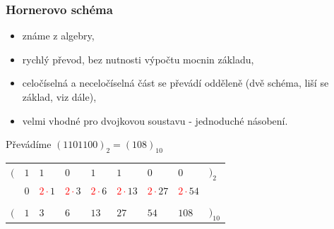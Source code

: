   \begin{frame}
    \frametitle{Hornerovo schéma}
    
		\begin{minipage}[t][0.4\textheight][t]{\textwidth}
      \begin{itemize}
        \item známe z algebry,
        \item rychlý převod, bez nutnosti výpočtu mocnin základu,
        \item celočíselná a neceločíselná část se převádí odděleně (dvě schéma, liší se základ, viz dále),
        \item velmi vhodné pro dvojkovou soustavu - jednoduché násobení.
      \end{itemize}
		\end{minipage}
		
		\begin{minipage}[t][0.5\textheight][t]{\textwidth}
      \boldmath
      Převádíme $(1101100)_2=(108)_{10}$
      
      \begin{center}
        \begin{tabular}{p{5mm} p{10mm} p{10mm} p{10mm} p{10mm} p{10mm} p{10mm} p{10mm} p{5mm}}
         $($ & $1$ & $1$ & $0$ & $1$ & $1$ & $0$ & $0$ & $)_2$ \\
             & $0$ & \textcolor{red}{$2\cdot$}$1$ & \textcolor{red}{$2\cdot$}$3$ & \textcolor{red}{$2\cdot$}$6$ & \textcolor{red}{$2\cdot$}$13$ & \textcolor{red}{$2\cdot$}$27$ & \textcolor{red}{$2\cdot$}$54$ & \\
         \hline \\
         $($ & $1$ & $3$ & $6$ & $13$ & $27$ & $54$ & $108$ & $)_{10}$
        \end{tabular}
      \end{center}
		\end{minipage}
		
	\end{frame}
  
